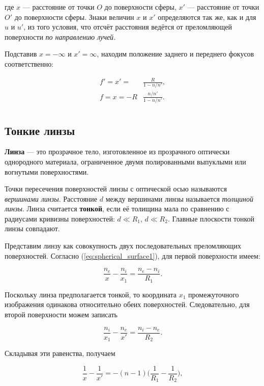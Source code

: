 где $x$ — расстояние от точки $O$ до поверхности сферы, $x'$ — расстояние от точки $O'$ до поверхности сферы. Знаки величин $x$ и $x'$ определяются так же, как и для $u$ и $u'$, из того условия, что отсчёт расстояния ведётся от преломляющей поверхности \textit{по направлению лучей}.

Подставив $x = -\infty$ и $x' = \infty$, находим положение заднего и переднего фокусов соответственно:

\begin{align*}
 f' = x' = &\frac{R}{1 - n/n'}, \\ 
 f = x = -R&\frac{n/n'}{1 - n/n'}. \\
\end{align*} 

\subsection{Тонкие линзы}

\textbf{Линза} — это прозрачное тело, изготовленное из прозрачного оптически однородного материала, ограниченное двумя полированными выпуклыми или вогнутыми поверхностями. 

Точки пересечения поверхностей линзы с оптической осью называются \textit{вершинами линзы}. Расстояние $d$ между вершинами линзы называется \textit{толщиной линзы}. Линза считается \textbf{тонкой}, если её толищина мала по сравнению с радиусами кривизны поверхностей: $d \ll R_{1}$, $d \ll R_{2}$. Главные плоскости тонкой линзы совпадают.

Представим линзу как совокупность двух последовательных преломляющих поверхностей. Согласно (\ref{eq:spherical_surface1}), для первой поверхности имеем:

\begin{equation*}
\frac{n_{e}}{x} - \frac{n_{i}}{x_{1}} = \frac{n_{e} - n_{i}}{R_{1}}.
\end{equation*}

Поскольку линза предполагается тонкой, то координата $x_{1}$ промежуточного изображения одинакова относительно обеих поверхностей. Следовательно, для второй поверхности можем записать

\begin{equation*}
\frac{n_{i}}{x_{1}} - \frac{n_{e}}{x'} = \frac{n_{i} - n_{e}}{R_{2}}.
\end{equation*}

Складывая эти равенства, получаем 

\begin{equation}
\frac{1}{x} - \frac{1}{x'} = -(n - 1) \Big(\frac{1}{R_{1}} - \frac{1}{R_{2}}\Big),
\label{eq:lens_formula}
\end{equation}

